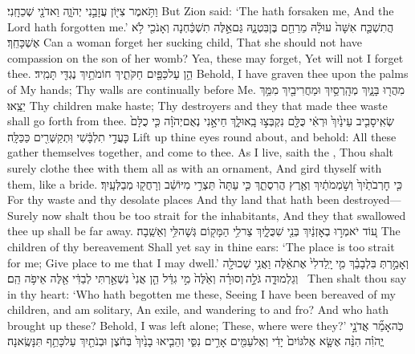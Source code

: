 {וַתֹּ֥אמֶר צִיּ֖וֹן עֲזָבַ֣נִי יְהֹוָ֑ה וַאדֹנָ֖י שְׁכֵחָֽנִי׃}
{But Zion said: ‘The \lord\space hath forsaken me, And the Lord hath forgotten me.’}
{הֲתִשְׁכַּ֤ח אִשָּׁה֙ עוּלָ֔הּ מֵרַחֵ֖ם בֶּן\maqqaf בִּטְנָ֑הּ גַּם\maqqaf אֵ֣לֶּה תִשְׁכַּ֔חְנָה וְאָנֹכִ֖י לֹ֥א אֶשְׁכָּחֵֽךְ׃}
{Can a woman forget her sucking child, That she should not have compassion on the son of her womb? Yea, these may forget, Yet will not I forget thee.}
{הֵ֥ן עַל\maqqaf כַּפַּ֖יִם חַקֹּתִ֑יךְ חוֹמֹתַ֥יִךְ נֶגְדִּ֖י תָּמִֽיד׃}
{Behold, I have graven thee upon the palms of My hands; Thy walls are continually before Me.}
{מִהֲר֖וּ בָּנָ֑יִךְ מְהָֽרְסַ֥יִךְ וּמַחֲרִיבַ֖יִךְ מִמֵּ֥ךְ יֵצֵֽאוּ׃}
{Thy children make haste; Thy destroyers and they that made thee waste shall go forth from thee.}
{שְׂאִֽי\maqqaf סָבִ֤יב עֵינַ֙יִךְ֙ וּרְאִ֔י כֻּלָּ֖ם נִקְבְּצ֣וּ בָֽאוּ\maqqaf לָ֑ךְ חַי\maqqaf אָ֣נִי נְאֻם\maqqaf יְהֹוָ֗ה כִּ֤י כֻלָּם֙ כָּעֲדִ֣י תִלְבָּ֔שִׁי וּֽתְקַשְּׁרִ֖ים כַּכַּלָּֽה׃}
{Lift up thine eyes round about, and behold: All these gather themselves together, and come to thee. As I live, saith the \lord, Thou shalt surely clothe thee with them all as with an ornament, And gird thyself with them, like a bride.}
{כִּ֤י חׇרְבֹתַ֙יִךְ֙ וְשֹׁ֣מְמֹתַ֔יִךְ וְאֶ֖רֶץ הֲרִסֻתֵ֑ךְ כִּ֤י עַתָּה֙ תֵּצְרִ֣י מִיּוֹשֵׁ֔ב וְרָחֲק֖וּ מְבַלְּעָֽיִךְ׃}
{For thy waste and thy desolate places And thy land that hath been destroyed— Surely now shalt thou be too strait for the inhabitants, And they that swallowed thee up shall be far away.}
{ע֚וֹד יֹאמְר֣וּ בְאׇזְנַ֔יִךְ בְּנֵ֖י שִׁכֻּלָ֑יִךְ צַר\maqqaf לִ֥י הַמָּק֖וֹם גְּשָׁה\maqqaf לִּ֥י וְאֵשֵֽׁבָה׃}
{The children of thy bereavement Shall yet say in thine ears: ‘The place is too strait for me; Give place to me that I may dwell.’}
{וְאָמַ֣רְתְּ בִּלְבָבֵ֗ךְ מִ֤י יָֽלַד\maqqaf לִי֙ אֶת\maqqaf אֵ֔לֶּה וַאֲנִ֥י שְׁכוּלָ֖ה וְגַלְמוּדָ֑ה גֹּלָ֣ה \legarmeh  וְסוּרָ֗ה וְאֵ֙לֶּה֙ מִ֣י גִדֵּ֔ל הֵ֤ן אֲנִי֙ נִשְׁאַ֣רְתִּי לְבַדִּ֔י אֵ֖לֶּה אֵיפֹ֥ה הֵֽם׃ \petucha }
{Then shalt thou say in thy heart: ‘Who hath begotten me these, Seeing I have been bereaved of my children, and am solitary, An exile, and wandering to and fro? And who hath brought up these? Behold, I was left alone; These, where were they?’}
{כֹּֽה\maqqaf אָמַ֞ר אֲדֹנָ֣י יֱהֹוִ֗ה הִנֵּ֨ה אֶשָּׂ֤א אֶל\maqqaf גּוֹיִם֙ יָדִ֔י וְאֶל\maqqaf עַמִּ֖ים אָרִ֣ים נִסִּ֑י וְהֵבִ֤יאוּ בָנַ֙יִךְ֙ בְּחֹ֔צֶן וּבְנֹתַ֖יִךְ עַל\maqqaf כָּתֵ֥ף תִּנָּשֶֽׂאנָה׃}

